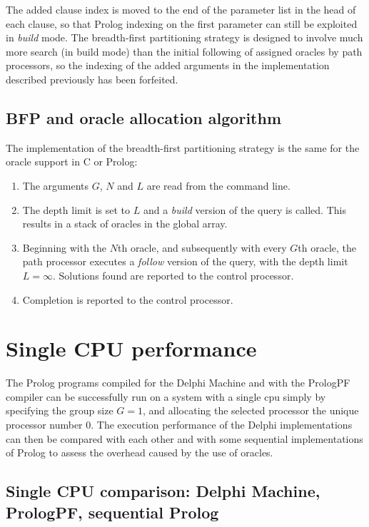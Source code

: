 The added clause index is moved to the end of the parameter list in the head of each clause, so that
Prolog indexing on the first parameter can still be exploited in \textit{build} mode.  The
breadth-first partitioning strategy is designed to involve much more search (in build mode) than the
initial following of assigned oracles by path processors, so the indexing of the added arguments 
in the implementation described previously has been
forfeited.

\subsection{BFP and oracle allocation algorithm}
\label{oracle_alloc}

The implementation of the breadth-first partitioning strategy is the same for
the oracle support in C or Prolog:
\begin{enumerate}
\item{The arguments $G$, $N$ and $L$ are read from the command line.}
\item{The depth limit is set to $L$ and a \textit{build} version of the
  query is called.  This results in a stack of oracles in the global array.}
\item{Beginning with the $N$th oracle, and subsequently with every $G$th
  oracle, the path processor executes a \textit{follow} version of the
  query, with the depth limit $L=\infty$.  Solutions found are reported to
  the control processor.}
\item{Completion is reported to the control processor.}
\end{enumerate}

\section{Single CPU performance} %

The Prolog programs compiled for the Delphi Machine and with the PrologPF
compiler can be successfully run on a system with a single cpu simply by
specifying the group size $G=1$, and allocating the selected processor the
unique processor number $0$.  The execution performance of the Delphi
implementations can then be compared with each other and with some
sequential implementations of Prolog to assess the overhead caused by the
use of oracles.

\subsection{Single CPU comparison: Delphi Machine, PrologPF, sequential Prolog}

